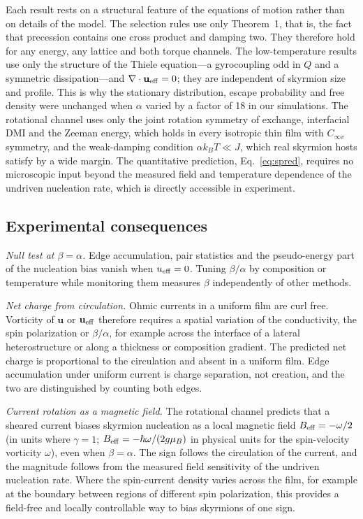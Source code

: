 \documentclass[aps,prb,twocolumn,superscriptaddress,longbibliography,floatfix]{revtex4-2}
\newcommand{\vu}{\mathbf u}
\newcommand{\ueff}{u_{\rm eff}}
\newcommand{\vueff}{\mathbf u_{\rm eff}}
\newcommand{\kT}{k_BT}
\newcommand{\Beff}{B_{\rm eff}}
\begin{document}
Each result rests on a structural feature of the equations of motion rather than on details of the model. The selection rules use only Theorem~1, that is, the fact that precession contains one cross product and damping two. They therefore hold for any energy, any lattice and both torque channels. The low-temperature results use only the structure of the Thiele equation---a gyrocoupling odd in $Q$ and a symmetric dissipation---and $\nabla\cdot\vueff=0$; they are independent of skyrmion size and profile. This is why the stationary distribution, escape probability and free density were unchanged when $\alpha$ varied by a factor of 18 in our simulations. The rotational channel uses only the joint rotation symmetry of exchange, interfacial DMI and the Zeeman energy, which holds in every isotropic thin film with $C_{\infty v}$ symmetry, and the weak-damping condition $\alpha\kT\ll J$, which real skyrmion hosts satisfy by a wide margin. The quantitative prediction, Eq.~\eqref{eq:spred}, requires no microscopic input beyond the measured field and temperature dependence of the undriven nucleation rate, which is directly accessible in experiment.

\subsection{Experimental consequences}

\emph{Null test at $\beta=\alpha$.} Edge accumulation, pair statistics and the pseudo-energy part of the nucleation bias vanish when $\ueff=0$. Tuning $\beta/\alpha$ by composition or temperature while monitoring them measures $\beta$ independently of other methods.

\emph{Net charge from circulation.} Ohmic currents in a uniform film are curl free. Vorticity of $\vu$ or $\vueff$ therefore requires a spatial variation of the conductivity, the spin polarization or $\beta/\alpha$, for example across the interface of a lateral heterostructure or along a thickness or composition gradient. The predicted net charge is proportional to the circulation and absent in a uniform film. Edge accumulation under uniform current is charge separation, not creation, and the two are distinguished by counting both edges.

\emph{Current rotation as a magnetic field.} The rotational channel predicts that a sheared current biases skyrmion nucleation as a local magnetic field $\Beff=-\omega/2$ (in units where $\gamma=1$; $\Beff=-\hbar\omega/(2g\mu_B)$ in physical units for the spin-velocity vorticity $\omega$), even when $\beta=\alpha$. The sign follows the circulation of the current, and the magnitude follows from the measured field sensitivity of the undriven nucleation rate. Where the spin-current density varies across the film, for example at the boundary between regions of different spin polarization, this provides a field-free and locally controllable way to bias skyrmions of one sign.
\end{document}
